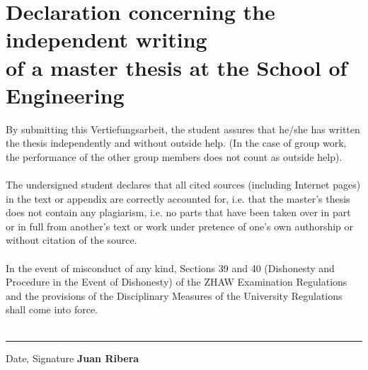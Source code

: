 \chapter*{\LARGE Declaration concerning the independent writing \\
of a master thesis at the School of Engineering}
By submitting this Vertiefungsarbeit, the student assures that he/she has written the thesis independently and without outside help. (In the case of group work, the performance of the other group members does not count as outside help). \\ \\
The undersigned student declares that all cited sources (including Internet pages) in the text or appendix are correctly accounted for, i.e. that the master's thesis does not contain any plagiarism, i.e. no parts that have been taken over in part or in full from another's text or work under pretence of one's own authorship or without citation of the source. \\ \\
In the event of misconduct of any kind, Sections 39 and 40 (Dishonesty and Procedure in the Event of Dishonesty) of the ZHAW Examination Regulations and the provisions of the Disciplinary Measures of the University Regulations shall come into force. \\
\vspace{50pt} \\
\begin{flushright}
	\noindent \rule{7.0cm}{0.4pt} \par
	\scriptsize{Date, Signature} \hspace{3cm} \textbf{\scriptsize{Juan Ribera}}
\end{flushright}